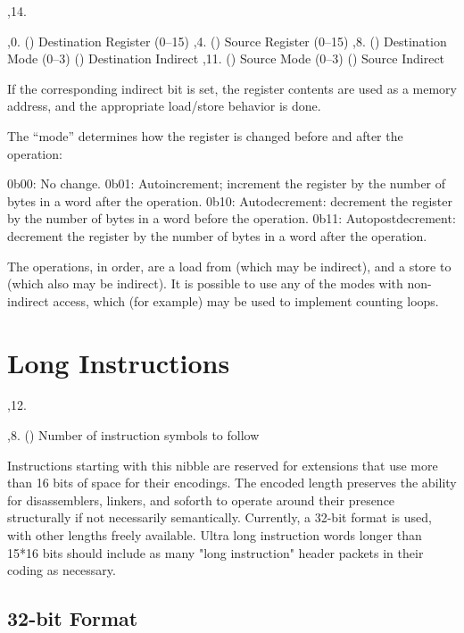 \noindent\ins{},14. 

\li \ins{},0. () Destination Register (0--15)
\li \ins{},4. () Source Register (0--15)
\li \ins{},8. () Destination Mode (0--3)
\li \ins{} () Destination Indirect
\li \ins{},11. () Source Mode (0--3)
\li \ins{} () Source Indirect

If the corresponding indirect bit is set, the register contents are used as a
memory address, and the appropriate load/store behavior is done.

The ``mode'' determines how the register is changed before and after the
operation:

\li 0b00: No change.
\li 0b01: Autoincrement; increment the register by the number of bytes in a
word after the operation.
\li 0b10: Autodecrement: decrement the register by the number of bytes in a
word before the operation.
\li 0b11: Autopostdecrement: decrement the register by the number of bytes in a
word after the operation.

The operations, in order, are a load from  (which may be indirect), and
a store to  (which also may be indirect). It is possible to use any of
the modes with non-indirect access, which (for example) may be used to
implement counting loops.

\section{Long Instructions}

\noindent\ins{},12. 

\li \ins{},8. () Number of instruction symbols to follow

Instructions starting with this nibble are reserved for extensions that use more than
16 bits of space for their encodings. The encoded length preserves the ability
for disassemblers, linkers, and soforth to operate around their presence structurally
if not necessarily semantically. Currently, a 32-bit format is used, with other
lengths freely available. Ultra long instruction words longer than 15*16 bits should
include as many "long instruction" header packets in their coding as necessary.

\subsection{32-bit Format}

\medskip
{
	\offinterlineskip
}
\medskip

